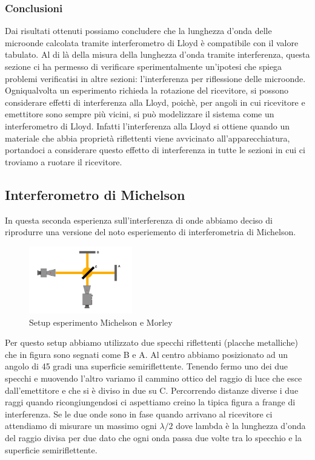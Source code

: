 \documentclass[letterpaper,12pt]{article}
\begin{document}
\subsubsection{Conclusioni}
Dai risultati ottenuti possiamo concludere che la lunghezza d'onda delle microonde calcolata tramite interferometro
di Lloyd è compatibile con il valore tabulato.
Al di là della misura della lunghezza d'onda tramite interferenza, questa sezione ci ha permesso di verificare
sperimentalmente un'ipotesi che spiega problemi verificatisi in altre sezioni: l'interferenza per riflessione 
delle microonde. Ogniqualvolta un esperimento richieda la rotazione del ricevitore, si possono considerare effetti 
di interferenza alla Lloyd, poichè, per angoli in cui ricevitore e emettitore sono sempre più vicini, 
si può modelizzare il sistema come un interferometro di Lloyd. Infatti l'interferenza alla Lloyd si ottiene 
quando un materiale che abbia proprietà riflettenti viene avvicinato all'apparecchiatura, portandoci a 
considerare questo effetto di interferenza in tutte le sezioni in cui ci troviamo a ruotare il ricevitore.\\

\subsection{Interferometro di Michelson}
In questa seconda esperienza sull'interferenza di onde abbiamo deciso di riprodurre una versione del noto esperiemento di 
interferometria di Michelson.
\begin{figure}[h!]
	\centering
	\includegraphics[width = 0.4\textwidth]{MichelsonSetup.png}
	\caption{Setup esperimento Michelson e Morley}
	\label{fig:GraficoBragg}
\end{figure}
Per questo setup abbiamo utilizzato due specchi riflettenti (placche metalliche)
che in figura sono segnati come B e A. Al centro abbiamo posizionato ad un angolo di 45 gradi una superficie semiriflettente.
Tenendo fermo uno dei due specchi e muovendo l'altro variamo il cammino ottico del raggio di luce che esce dall'emettitore e che si è diviso in due su C.
Percorrendo distanze diverse i due raggi quando ricongiungendosi ci aspettiamo creino la tipica figura a frange di interferenza.  
Se le due onde sono in fase quando arrivano al ricevitore ci attendiamo di misurare un massimo ogni $\lambda/2$ dove lambda è la lunghezza d'onda del raggio divisa per due dato che 
ogni onda passa due volte tra lo specchio e la superficie semiriflettente.
\end{document}
